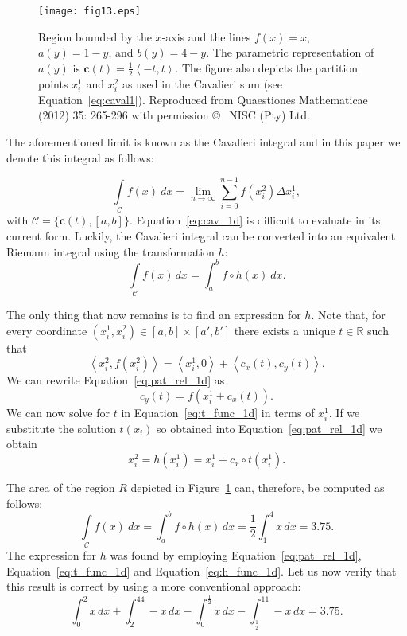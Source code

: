 \documentclass{article}
\theoremstyle{theorem}
\theoremstyle{definition}
\begin{document}
\begin{figure}[htb]
\centering
\texttt{[image: fig13.eps]}
\caption{Region bounded by the $x$-axis and the lines $f(x)=x$, $a(y)=1-y$, and $b(y)=4-y$. The parametric representation of $a(y)$ is $\mathbf{c}(t) = \frac{1}{2} \left <-t,t \right >$. The figure also depicts the partition points $x_i^1$ and $x_i^2$ as used in the Cavalieri sum (see Equation~\eqref{eq:caval1}). Reproduced from Quaestiones Mathematicae (2012) 35: 265-296 with permission \copyright~ NISC (Pty) Ltd.}
\label{fig:caval2}
\end{figure}

\noindent
The aforementioned limit is known as the Cavalieri integral and in this paper we denote this integral as follows:

\begin{equation}
\label{eq:cav_1d}
\int \limits_{\mathcal{C}} f(x)~dx = \lim_{n \rightarrow \infty}  \sum_{i=0}^{n-1} f(x_i^2) \Delta x_i^1,
\end{equation}
with $\mathcal{C} = \{\mathbf{c}(t),[a,b]\}$. Equation~\eqref{eq:cav_1d} is difficult to evaluate in its current form. Luckily, the Cavalieri integral 
can be converted into an equivalent Riemann integral using the transformation $h$:
 \begin{equation}
 \int \limits_{\mathcal{C}} f(x)\, dx = \int_{a}^{b} f\circ h(x)~dx. 
\end{equation}

\noindent
The only thing that now remains is to find an expression for $h$. Note that, for every coordinate $(x_i^1,x_i^2) \in [a,b] \times [a',b']$ there exists a unique $t\in\mathbb{R}$ such that
\begin{equation}
 \label{eq:pat_rel_1d}
 \left <x_i^2,f(x_i^2) \right > = \left <x_i^1,0 \right> + \left<c_x(t),c_y(t) \right >.
 \end{equation}
 We can rewrite Equation~\eqref{eq:pat_rel_1d} as
 \begin{equation}
 \label{eq:t_func_1d}
 c_y(t) = f(x_i^1 + c_x(t)).
 \end{equation}
 We can now solve for $t$ in Equation~\eqref{eq:t_func_1d} in terms of $x_i^1$. If we substitute the solution $t(x_i)$ so obtained into Equation~\ref{eq:pat_rel_1d} we obtain 
\begin{equation}
\label{eq:h_func_1d}
 x_i^2 = h(x_i^1) = x_i^1 + c_x\circ t(x_i^1).
\end{equation}

\noindent
The area of the region $R$ depicted in Figure~\ref{fig:caval2} can, therefore, be computed as follows:
\begin{equation}
\int \limits_{\mathcal{C}} f(x)~dx = \int_a^b f \circ h (x)\, dx = \dfrac{1}{2}\int_1^4x\, dx = 3.75.  
\end{equation}
The expression for $h$ was found by employing Equation~\eqref{eq:pat_rel_1d}, Equation~\eqref{eq:t_func_1d} and Equation~\eqref{eq:h_func_1d}. Let us now verify that 
this result is correct by using a more conventional approach:
\begin{equation}
\int_0^2x\, dx+\int_2^44-x\, dx- \int_0^{\frac{1}{2}}x\, dx-\int_{\frac{1}{2}}^11-x\, dx = 3.75. 
\end{equation}
\end{document}
